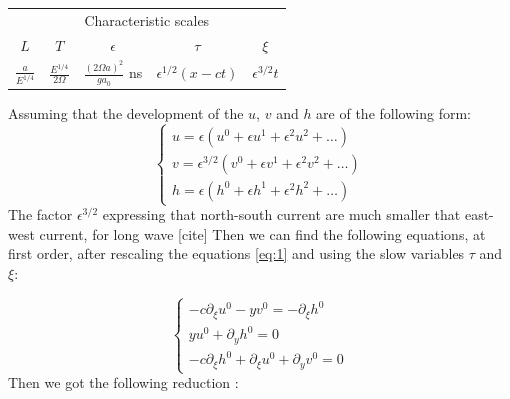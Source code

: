 \documentclass[11pt,a4paper]{report}
\begin{document}
\begin{multicols}{2}
    \begin{center}
        \begin{tabular}{ccccc}
            \toprule
            \multicolumn{5}{c}{Characteristic scales}                                                                                        \\
            \cmidrule{1 -5}
            $L$                 & $T$                        & $\epsilon$                      & $\tau$                 & $\xi$              \\
            \midrule
            $\frac{a}{E^{1/4}}$ & $\frac{E^{1/4}}{2 \Omega}$ & $\frac{(2\Omega a)^2}{ga_0}$ ns & $\epsilon^{1/2}(x-ct)$ & $\epsilon^{3/2}t $ \\
            \bottomrule
        \end{tabular}
    \end{center}
    Assuming that the development of the $u$, $v$ and $h$ are of the following form:
    \begin{equation*}
        \begin{cases}
            u = \epsilon(u^0 + \epsilon u^1 + \epsilon^2 u^2 + \dots)       \\
            v = \epsilon^{3/2}(v^0 + \epsilon v^1 + \epsilon^2 v^2 + \dots) \\
            h = \epsilon(h^0 + \epsilon h^1 + \epsilon^2 h^2 + \dots)
        \end{cases}
    \end{equation*}
    The factor $\epsilon^{3/2}$ expressing that north-south current are much smaller that east-west current, for long wave [cite]
    Then we can find the following equations, at first order, after rescaling the equations \ref{eq:1} and using the slow variables $\tau$ and $\xi$:

    \begin{equation}
        \label{eq:2}
        \begin{cases}
            -c \partial_\xi u^0 -  y v^0 = -\partial_\xi h^0 \\
            y u^0 + \partial_y h^0 =0                        \\
            -c \partial_\xi h^0 + \partial_\xi u^0+ \partial_y v^0 =0
        \end{cases}
    \end{equation}
    Then we got the following reduction :


\end{multicols}
\end{document}
